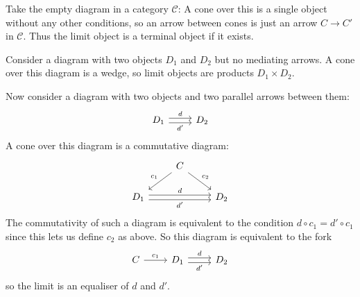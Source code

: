 \documentclass[article, a4paper, 11pt, oneside]{memoir}
\numberwithin{equation}{chapter}
\newcommand{\cat}[1]{\mathcal{#1}}
\newcommand{\catC}{\cat{C}}
\begin{document}
\begin{examplebreak}
    \begin{enumexample}
        \item Take the empty diagram in a category $\catC$: A cone over this is a single object without any other conditions, so an arrow between cones is just an arrow $C \to C'$ in $\catC$. Thus the limit object is a terminal object if it exists.
        
        \item Consider a diagram with two objects $D_1$ and $D_2$ but no mediating arrows. A cone over this diagram is a wedge, so limit objects are products $D_1 \times D_2$.
        
        \item Now consider a diagram with two objects and two parallel arrows between them:
        \begin{equation*}
            \begin{tikzcd}
                D_1
                    \ar[r, "d", shift left]
                    \ar[r, "d'", shift right, swap]
                & D_2
            \end{tikzcd}
        \end{equation*}
        A cone over this diagram is a commutative diagram:
        \begin{equation*}
            \begin{tikzcd}
                & C
                    \ar[dl, "c_1", swap]
                    \ar[dr, "c_2"]
                \\
                D_1
                    \ar[rr, "d", shift left]
                    \ar[rr, "d'", shift right, swap]
                && D_2
            \end{tikzcd}
        \end{equation*}
        The commutativity of such a diagram is equivalent to the condition $d \circ c_1 = d' \circ c_1$ since this lets us define $c_2$ as above. So this diagram is equivalent to the fork
        \begin{equation*}
            \begin{tikzcd}
                C
                    \ar[r, "c_1"]
                & D_1
                    \ar[r, "d", shift left]
                    \ar[r, "d'", shift right, swap]
                & D_2
            \end{tikzcd}
        \end{equation*}
        so the limit is an equaliser of $d$ and $d'$.
    \end{enumexample}
\end{examplebreak}
\end{document}
